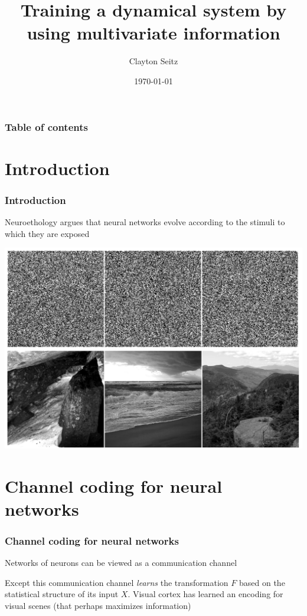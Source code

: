 \documentclass{beamer}
\begin{document}
\title{Training a dynamical system by using multivariate information}  
\author{Clayton Seitz}
\date{\today} 

\begin{frame}[plain]
\titlepage
\end{frame}

\begin{frame}[plain]\frametitle{Table of contents}\tableofcontents
\end{frame} 

\section{Introduction} 

\begin{frame}[plain]
\frametitle{Introduction} 

Neuroethology argues that neural networks evolve according to the stimuli to which they are exposed

\begin{center}
\includegraphics[scale=0.35]{natural-images}
\end{center}

\end{frame}


\section{Channel coding for neural networks} 

\begin{frame}[plain]
\frametitle{Channel coding for neural networks} 

Networks of neurons can be viewed as a communication channel

Except this communication channel \emph{learns} the transformation $F$ based on the statistical structure of its input $X$. Visual cortex has learned an encoding for visual scenes (that perhaps maximizes information)

\end{frame}
\end{document}
